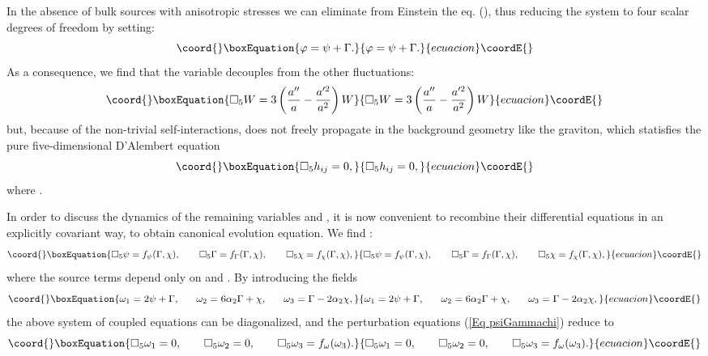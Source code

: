 \documentclass[a4paper,12pt]{article}
\begin{document}
In the absence of bulk sources with anisotropic stresses we
can eliminate \myHighlight{$\varphi$}\coordHE{} from Einstein the eq. (\coordHE{}), thus reducing
the system to four scalar degrees of freedom by setting:
\begin{equation}\coord{}\boxEquation{
\varphi=\psi+\Gamma. \label{318}
}{
\varphi=\psi+\Gamma. }{ecuacion}\coordE{}\end{equation}
As a consequence, we find that the variable \coordHE{}
decouples from the other fluctuations:
\begin{equation}\coord{}\boxEquation{
\square_5 W=3\left( \frac{a''}{a}-\frac{a'^2}{a^2} \right)W
\label{319}
}{
\square_5 W=3\left( \frac{a''}{a}-\frac{a'^2}{a^2} \right)W
}{ecuacion}\coordE{}\end{equation}
but, because of the non-trivial self-interactions, \coordHE{} does not freely
propagate in the background geometry like the graviton, which
statisfies the pure  five-dimensional D'Alembert equation
\begin{equation}\coord{}\boxEquation{
\square_5 h_{ij}=0 \label{Eq libera},
}{
\square_5 h_{ij}=0 ,
}{ecuacion}\coordE{}\end{equation}
 where \coordHE{}.

In order to discuss the dynamics of the remaining variables \myHighlight{$\psi,
\Gamma$}\coordHE{} and \myHighlight{$\chi$}\coordHE{}, it is now convenient to recombine their
differential equations in an explicitly covariant way,  to obtain
canonical evolution equation. We find :
\begin{equation}\coord{}\boxEquation{
\square_5 \psi = f_{\psi}(\Gamma,\chi), ~~~~~~ \square_5 \Gamma =
f_{\Gamma}(\Gamma,\chi), ~~~~~~ \square_5 \chi =
f_{\chi}(\Gamma,\chi),
\label{Eq psiGammachi}
}{
\square_5 \psi = f_{\psi}(\Gamma,\chi), ~~~~~~ \square_5 \Gamma =
f_{\Gamma}(\Gamma,\chi), ~~~~~~ \square_5 \chi =
f_{\chi}(\Gamma,\chi),
}{ecuacion}\coordE{}\end{equation}
where the source terms
 depend only on \myHighlight{$\Gamma$}\coordHE{} and \myHighlight{$\chi$}\coordHE{}. By introducing the fields
\begin{equation}\coord{}\boxEquation{
\omega_1=2\psi+ \Gamma, ~~~~~ \omega_2=6\alpha_2 \Gamma +\chi,
~~~~~ \omega_3=\Gamma- 2\alpha_2 \chi, \label{323}
}{
\omega_1=2\psi+ \Gamma, ~~~~~ \omega_2=6\alpha_2 \Gamma +\chi,
~~~~~ \omega_3=\Gamma- 2\alpha_2 \chi, }{ecuacion}\coordE{}\end{equation}
the above system of coupled equations can be diagonalized, and the
perturbation equations (\ref{Eq psiGammachi}) reduce to
\begin{equation}\coord{}\boxEquation{
\square_5 \omega_1=0, ~~~~~~ \square_5 \omega_2=0 , ~~~~~~
\square_5 \omega_3= f_\omega (\omega_3).  \label{Eq omega}
}{
\square_5 \omega_1=0, ~~~~~~ \square_5 \omega_2=0 , ~~~~~~
\square_5 \omega_3= f_\omega (\omega_3).  }{ecuacion}\coordE{}\end{equation}
\end{document}
